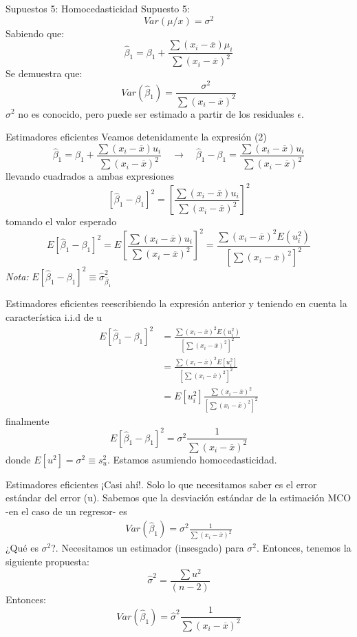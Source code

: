 \begin{frame}{Supuestos 5: Homocedasticidad}
	Supuesto 5:
	$$Var(\mu / x) = \sigma^{2}$$
	Sabiendo que:
	$$\hat{\beta}_{1} = \beta_{1} + \frac{\sum (x_{i}-\overline{x})\mu_{i}}{\sum (x_{i}-\overline{x})^2}$$
	Se demuestra que:
	$$Var(\hat{\beta}_{1})=\frac{\sigma^{2}}{\sum (x_{i}-\overline{x})^2}$$
	$\sigma^{2}$ no es conocido, pero puede ser estimado a partir de los residuales $\epsilon$.
\end{frame}
\begin{frame}{Estimadores eficientes}
	Veamos detenidamente la expresión (2)
		$$\widehat{\beta}_1 = \beta_1 + \frac{\sum (x_{i}-\overline{x})u_i}{\sum (x_{i}-\overline{x})^2} \quad \rightarrow \quad \widehat{\beta}_1 - \beta_1 = \frac{\sum (x_{i}-\overline{x})u_i}{\sum (x_{i}-\overline{x})^2} $$
	llevando cuadrados a ambas expresiones
		$$\left[ \widehat{\beta}_1 - \beta_1\right]^2 = \left[\frac{\sum (x_{i}-\overline{x})u_i}{\sum (x_{i}-\overline{x})^2}\right]^2 $$
	tomando el valor esperado
		$$E\left[ \widehat{\beta}_1 - \beta_1\right]^2 = E\left[\frac{\sum (x_{i}-\overline{x})u_i}{\sum (x_{i}-\overline{x})^2}\right]^2 = \frac{\sum (x_{i}-\overline{x})^2E(u_i^2)}{\left[\sum (x_{i}-\overline{x})^2\right]^2}$$
	\textit{Nota:} $E\left[ \widehat{\beta}_1 - \beta_1\right]^2 \equiv \widehat{\sigma}_{\widehat{\beta}_1}^{2}$
\end{frame}
\begin{frame}{Estimadores eficientes}
	reescribiendo la expresión anterior y teniendo en cuenta la característica i.i.d de u
		\begin{align*}
			E\left[ \widehat{\beta}_1 - \beta_1\right]^2 & = \frac{\sum (x_{i}-\overline{x})^2E(u_i^2)}{\left[\sum (x_{i}-\overline{x})^2\right]^2}\\
			& = \frac{\sum (x_{i}-\overline{x})^2E[u_i^2]}{\left[\sum (x_{i}-\overline{x})^2\right]^2}\\
			& = E[u_i^2] \frac{\sum (x_{i}-\overline{x})^2}{\left[\sum (x_{i}-\overline{x})^2\right]^2} \tag{3}
		\end{align*}
	finalmente
		$$E\left[ \widehat{\beta}_1 - \beta_1\right]^2 = \sigma^{2}\frac{1}{\sum (x_{i}-\overline{x})^2}$$
	donde $E[u^2]=\sigma^{2} \equiv s_{u}^{2}$. Estamos asumiendo homocedasticidad.
\end{frame}
\begin{frame}{Estimadores eficientes}
	¡Casi ahí!. Solo lo que necesitamos saber es el error estándar del error (u). Sabemos que la desviación estándar de la estimación MCO -en el caso de un regresor- es
		\begin{align*}
			Var(\widehat{\beta}_1) = \sigma^{2}\frac{1}{\sum (x_{i}-\overline{x})^2} \tag{4}
		\end{align*}
	¿Qué es $\sigma^{2}$?. Necesitamos un estimador (insesgado) para $\sigma^{2}$. Entonces, tenemos la siguiente propuesta:
		$$\widehat{\sigma}^{2} = \frac{\sum u^2}{(n-2)}$$
	Entonces:
		$$Var(\widehat{\beta}_1) = \widehat{\sigma}^{2}\frac{1}{\sum (x_{i}-\overline{x})^2}$$
\end{frame}
